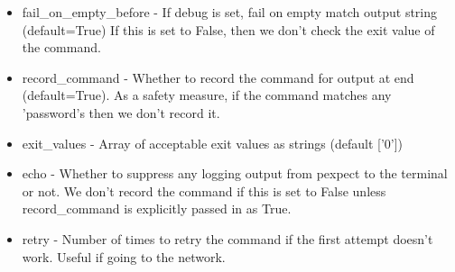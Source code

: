 \begin{boxedminipage}{\funcwidth}
\begin{itemize}
      \item fail\_on\_empty\_before       - If debug is set, fail on empty 
        match output string (default=True) If this is set to False, then we
        don't check the exit value of the command.

      \item record\_command             - Whether to record the command for 
        output at end (default=True). As a safety measure, if the command 
        matches any 'password's then we don't record it.

      \item exit\_values                - Array of acceptable exit values as 
        strings (default ['0'])

      \item echo                       - Whether to suppress any logging output
        from pexpect to the terminal or not. We don't record the command if
        this is set to False unless record\_command is explicitly passed in
        as True.

      \item retry                      - Number of times to retry the command 
        if the first attempt doesn't work. Useful if going to the network.

    \end{itemize}

\setlength{\parskip}{1ex}
    \end{boxedminipage}

    \label{shutit_global:ShutIt:send}

    \vspace{0.5ex}

